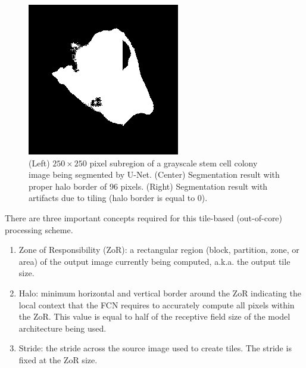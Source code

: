 \documentclass[10pt, indentfirst]{article}
\begin{document}
\begin{figure}
\begin{minipage}{0.32\columnwidth}
	\end{minipage}
	\begin{minipage}{0.32\columnwidth}
		\includegraphics[width=\columnwidth]{figs/no_halo.png}
	\end{minipage}
	\caption{(Left) $250 \times 250$ pixel subregion of a grayscale stem cell colony image being segmented by U-Net. (Center) Segmentation result with proper halo border of 96 pixels. (Right) Segmentation result with artifacts due to tiling (halo border is equal to $0$).} 
	\label{fig:nohalo}
\end{figure}

There are three important concepts required for this tile-based (out-of-core) processing scheme. 
\begin{enumerate}
	\item Zone of Responsibility (ZoR): a rectangular region (block, partition, zone, or area) of the output image currently being computed, a.k.a. the output tile size.
	\item Halo: minimum horizontal and vertical border around the ZoR indicating the local context that the FCN requires to accurately compute all pixels within the ZoR. This value is equal to half of the receptive field size of the model architecture being used. 
	\item Stride: the stride across the source image used to create tiles. The stride is fixed at the ZoR size.
\end{enumerate}
\end{document}
